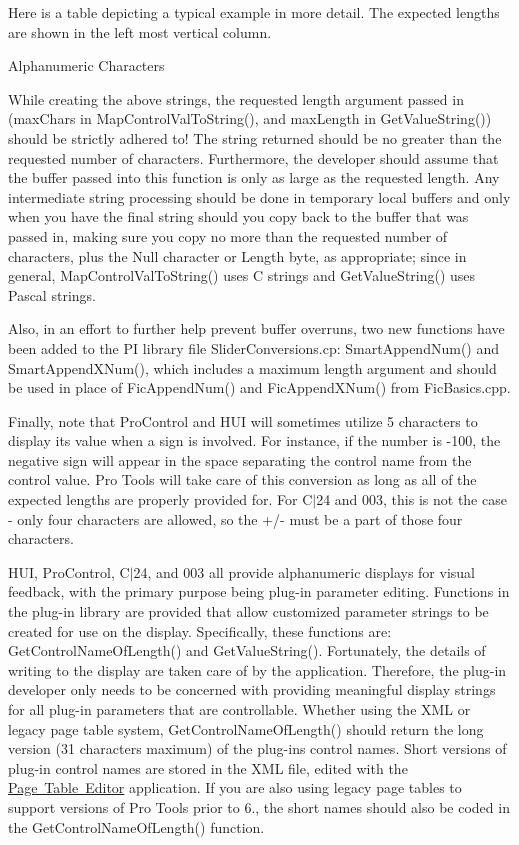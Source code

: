 Here is a table depicting a typical example in more detail. The expected lengths are shown in the left most vertical column.

  Alphanumeric Characters

While creating the above strings, the requested length argument passed in (max\+Chars in Map\+Control\+Val\+To\+String(), and max\+Length in Get\+Value\+String()) should be strictly adhered to! The string returned should be no greater than the requested number of characters. Furthermore, the developer should assume that the buffer passed into this function is only as large as the requested length. Any intermediate string processing should be done in temporary local buffers and only when you have the final string should you copy back to the buffer that was passed in, making sure you copy no more than the requested number of characters, plus the Null character or Length byte, as appropriate; since in general, Map\+Control\+Val\+To\+String() uses C strings and Get\+Value\+String() uses Pascal strings.

Also, in an effort to further help prevent buffer overruns, two new functions have been added to the PI library file Slider\+Conversions.\+cp\+: Smart\+Append\+Num() and Smart\+Append\+X\+Num(), which includes a maximum length argument and should be used in place of Fic\+Append\+Num() and Fic\+Append\+X\+Num() from Fic\+Basics.\+cpp.

Finally, note that Pro\+Control and H\+UI will sometimes utilize 5 characters to display its value when a sign is involved. For instance, if the number is -\/100, the negative sign will appear in the space separating the control name from the control value. Pro Tools will take care of this conversion as long as all of the expected lengths are properly provided for. For C$\vert$24 and 003, this is not the case -\/ only four characters are allowed, so the +/-\/ must be a part of those four characters.

H\+UI, Pro\+Control, C$\vert$24, and 003 all provide alphanumeric displays for visual feedback, with the primary purpose being plug-\/in parameter editing. Functions in the plug-\/in library are provided that allow customized parameter strings to be created for use on the display. Specifically, these functions are\+: Get\+Control\+Name\+Of\+Length() and Get\+Value\+String(). Fortunately, the details of writing to the display are taken care of by the application. Therefore, the plug-\/in developer only needs to be concerned with providing meaningful display strings for all plug-\/in parameters that are controllable. Whether using the X\+ML or legacy page table system, Get\+Control\+Name\+Of\+Length() should return the long version (31 characters maximum) of the plug-\/in\textquotesingle{}s control names. Short versions of plug-\/in control names are stored in the X\+ML file, edited with the \mbox{\hyperlink{a00833_subsection_creating_page_tables_in_pete}{Page Table Editor}} application. If you are also using legacy page tables to support versions of Pro Tools prior to 6., the short names should also be coded in the Get\+Control\+Name\+Of\+Length() function.

